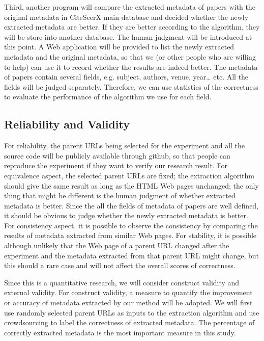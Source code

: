 \documentclass[prodmode]{acmsmall} %
\begin{document}
Third, another program will compare the extracted metadata of papers with the original metadata in CiteSeerX main database and decided whether the newly extracted metadata are better. If they are better according to the algorithm, they will be store into another database. The human judgment will be introduced at this point. A Web application will be provided to list the newly extracted metadata and the original metadata, so that we (or other people who are willing to help) can use it to record whether the results are indeed better. The metadata of papers contain several fields, e.g. subject, authors, venue, year… etc. All the fields will be judged separately. Therefore, we can use statistics of the correctness to evaluate the performance of the algorithm we use for each field.

\subsection{Reliability and Validity}

For reliability, the parent URLs being selected for the experiment and all the source code will be publicly available through github, so that people can reproduce the experiment if they want to verify our research result. For equivalence aspect, the selected parent URLs are fixed; the extraction algorithm should give the same result as long as the HTML Web pages unchanged; the only thing that might be different is the human judgment of whether extracted metadata is better. Since the all the fields of metadata of papers are well defined, it should be obvious to judge whether the newly extracted metadata is better. For consistency aspect, it is possible to observe the consistency by comparing the results of metadata extracted from similar Web pages. For stability, it is possible although unlikely that the Web page of a parent URL changed after the experiment and the metadata extracted from that parent URL might change, but this should a rare case and will not affect the overall scores of correctness.

Since this is a quantitative research, we will consider construct validity and external validity. For construct validity, a measure to quantify the improvement or accuracy of metadata extracted by our method will be adopted. We will first use randomly selected parent URLs as inputs to the extraction algorithm and use crowdsourcing to label the correctness of extracted metadata. The percentage of correctly extracted metadata is the most important measure in this study.
\end{document}
